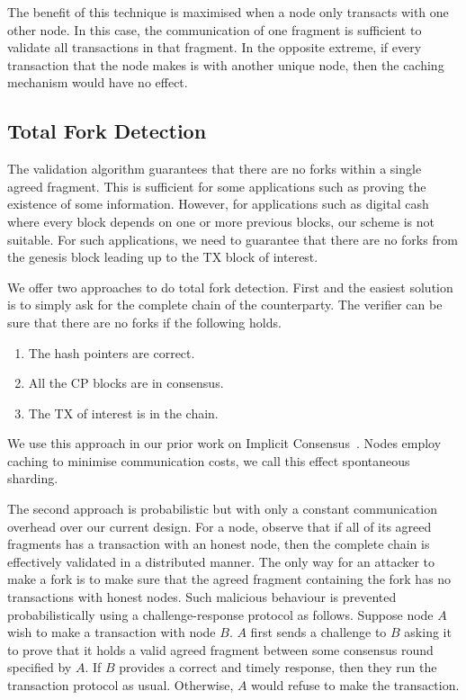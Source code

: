 The benefit of this technique is maximised when a node only transacts with one other node.
In this case, the communication of one fragment is sufficient to validate all transactions in that fragment.
In the opposite extreme, if every transaction that the node makes is with another unique node,
then the caching mechanism would have no effect.

\subsection{Total Fork Detection}
\label{sec:fork}
The validation algorithm guarantees that there are no forks within a single agreed fragment.
This is sufficient for some applications such as proving the existence of some information.
However, for applications such as digital cash where every block depends on one or more previous blocks,
our scheme is not suitable.
For such applications, we need to guarantee that there are no forks from the genesis block leading up to the TX block of interest.

We offer two approaches to do total fork detection.
First and the easiest solution is to simply ask for the complete chain of the counterparty.
The verifier can be sure that there are no forks if the following holds.
\begin{enumerate}
    \item The hash pointers are correct.
    \item All the CP blocks are in consensus.
    \item The TX of interest is in the chain.
\end{enumerate}
We use this approach in our prior work on Implicit Consensus~\cite{implicitconsensus}.
Nodes employ caching to minimise communication costs, we call this effect spontaneous sharding.

The second approach is probabilistic but with only a constant communication overhead over our current design.
For a node, observe that if all of its agreed fragments has a transaction with an honest node,
then the complete chain is effectively validated in a distributed manner.
The only way for an attacker to make a fork is to make sure that the agreed fragment containing the fork has no transactions with honest nodes.
Such malicious behaviour is prevented probabilistically using a challenge-response protocol as follows.
Suppose node $A$ wish to make a transaction with node $B$.
$A$ first sends a challenge to $B$ asking it to prove that it holds a valid agreed fragment between some consensus round specified by $A$.
If $B$ provides a correct and timely response, then they run the transaction protocol as usual.
Otherwise, $A$ would refuse to make the transaction.

